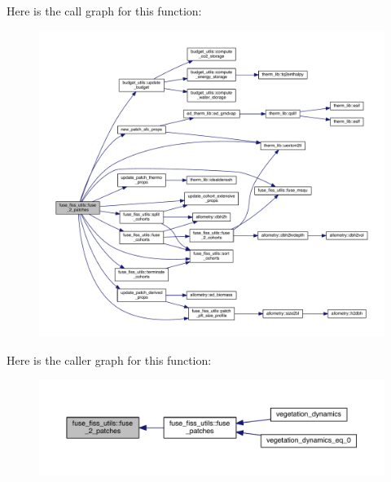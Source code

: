 Here is the call graph for this function\+:\nopagebreak
\begin{figure}[H]
\begin{center}
\leavevmode
\includegraphics[width=350pt]{namespacefuse__fiss__utils_ac265957681eedff0e33bd5c3cdeca31d_cgraph}
\end{center}
\end{figure}




Here is the caller graph for this function\+:\nopagebreak
\begin{figure}[H]
\begin{center}
\leavevmode
\includegraphics[width=350pt]{namespacefuse__fiss__utils_ac265957681eedff0e33bd5c3cdeca31d_icgraph}
\end{center}
\end{figure}


\hypertarget{namespacefuse__fiss__utils_adebb5663823fc54b5e7f28ce1e365afe}{}
